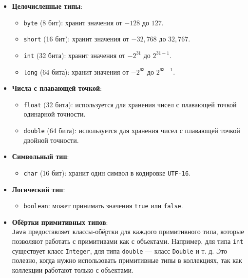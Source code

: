 \begin{itemize}
    \item \textbf{Целочисленные типы}:
    \begin{itemize}
        \item \texttt{byte} (8 бит): хранит значения от $-128$ до $127$.
        \item \texttt{short} (16 бит): хранит значения от $-32,768$ до $32,767$.
        \item \texttt{int} (32 бита): хранит значения от $-2^{31}$ до $2^{31-1}$.
        \item \texttt{long} (64 бита): хранит значения от $-2^{63}$ до $2^{63-1}$.
    \end{itemize}

    \item \textbf{Числа с плавающей точкой}:
    \begin{itemize}
        \item \texttt{float} (32 бита): используется для хранения чисел с плавающей точкой одинарной точности.
        \item \texttt{double} (64 бита): используется для хранения чисел с плавающей точкой двойной точности.
    \end{itemize}

    \item \textbf{Символьный тип}:
    \begin{itemize}
        \item \texttt{char} (16 бит): хранит один символ в кодировке \texttt{UTF-16}.
    \end{itemize}

    \item \textbf{Логический тип}:
    \begin{itemize}
        \item \texttt{boolean}: может принимать значения \texttt{true} или \texttt{false}.
    \end{itemize}

    \item \textbf{Обёртки примитивных типов}: \\
    \texttt{Java} предоставляет классы-обёртки для каждого примитивного типа, которые позволяют работать с примитивами как с объектами. Например, для типа \texttt{int} существует класс \texttt{Integer}, для типа \texttt{double} — класс \texttt{Double} и т. д. Это полезно, когда нужно использовать примитивные типы в коллекциях, так как коллекции работают только с объектами.
\end{itemize}

